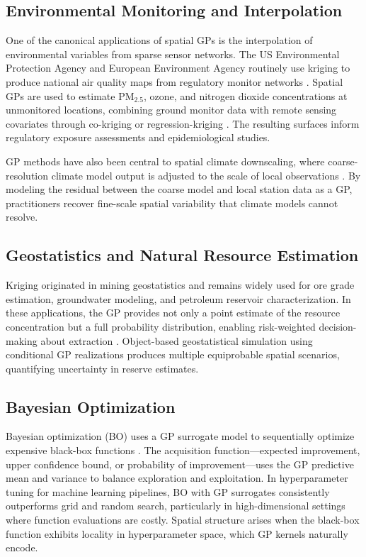 \documentclass[conference]{IEEEtran}
\begin{document}
\subsection{Environmental Monitoring and Interpolation}

One of the canonical applications of spatial GPs is the interpolation of environmental variables from sparse sensor networks. The US Environmental Protection Agency and European Environment Agency routinely use kriging to produce national air quality maps from regulatory monitor networks \cite{hoek2008review}. Spatial GPs are used to estimate PM$_{2.5}$, ozone, and nitrogen dioxide concentrations at unmonitored locations, combining ground monitor data with remote sensing covariates through co-kriging or regression-kriging \cite{knotters1995comparison}. The resulting surfaces inform regulatory exposure assessments and epidemiological studies.

GP methods have also been central to spatial climate downscaling, where coarse-resolution climate model output is adjusted to the scale of local observations \cite{willmott1985statistics}. By modeling the residual between the coarse model and local station data as a GP, practitioners recover fine-scale spatial variability that climate models cannot resolve.

\subsection{Geostatistics and Natural Resource Estimation}

Kriging originated in mining geostatistics and remains widely used for ore grade estimation, groundwater modeling, and petroleum reservoir characterization. In these applications, the GP provides not only a point estimate of the resource concentration but a full probability distribution, enabling risk-weighted decision-making about extraction \cite{cressie1993statistics}. Object-based geostatistical simulation using conditional GP realizations produces multiple equiprobable spatial scenarios, quantifying uncertainty in reserve estimates.

\subsection{Bayesian Optimization}

Bayesian optimization (BO) uses a GP surrogate model to sequentially optimize expensive black-box functions \cite{snoek2012practical}. The acquisition function---expected improvement, upper confidence bound, or probability of improvement---uses the GP predictive mean and variance to balance exploration and exploitation. In hyperparameter tuning for machine learning pipelines, BO with GP surrogates consistently outperforms grid and random search, particularly in high-dimensional settings where function evaluations are costly. Spatial structure arises when the black-box function exhibits locality in hyperparameter space, which GP kernels naturally encode.
\end{document}
